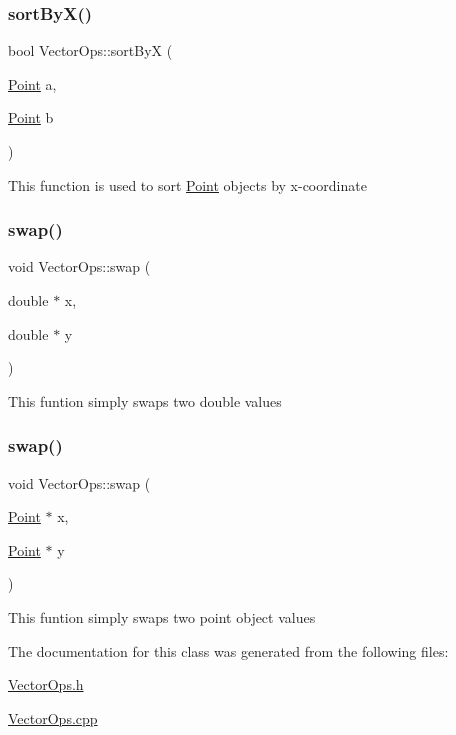 \subsubsection{\texorpdfstring{sort\+By\+X()}{sortByX()}}
{\footnotesize\ttfamily bool Vector\+Ops\+::sort\+ByX (\begin{DoxyParamCaption}\item[{\hyperlink{classPoint}{Point}}]{a,  }\item[{\hyperlink{classPoint}{Point}}]{b }\end{DoxyParamCaption})\hspace{0.3cm}{\ttfamily [static]}}

This function is used to sort \hyperlink{classPoint}{Point} objects by x-\/coordinate \mbox{\label{classVectorOps_aaa12e98c15826f69b92a7fef41e61db5}} 
\subsubsection{\texorpdfstring{swap()}{swap()}\hspace{0.1cm}{\footnotesize\ttfamily [1/2]}}
{\footnotesize\ttfamily void Vector\+Ops\+::swap (\begin{DoxyParamCaption}\item[{double $\ast$}]{x,  }\item[{double $\ast$}]{y }\end{DoxyParamCaption})}

This funtion simply swaps two double values \mbox{\label{classVectorOps_a86b58d279da36403a22f9fb9ff85dd47}} 
\subsubsection{\texorpdfstring{swap()}{swap()}\hspace{0.1cm}{\footnotesize\ttfamily [2/2]}}
{\footnotesize\ttfamily void Vector\+Ops\+::swap (\begin{DoxyParamCaption}\item[{\hyperlink{classPoint}{Point} $\ast$}]{x,  }\item[{\hyperlink{classPoint}{Point} $\ast$}]{y }\end{DoxyParamCaption})}

This funtion simply swaps two point object values 

The documentation for this class was generated from the following files\+:\begin{DoxyCompactItemize}
\item 
\hyperlink{VectorOps_8h}{Vector\+Ops.\+h}\item 
\hyperlink{VectorOps_8cpp}{Vector\+Ops.\+cpp}\end{DoxyCompactItemize}
